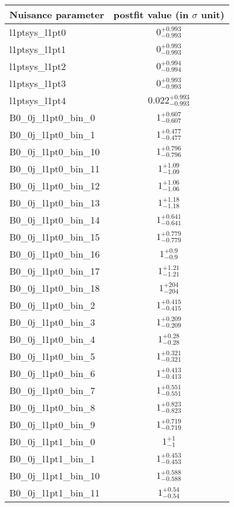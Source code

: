 
\begin{tabular}{|l|c|}
\hline
Nuisance parameter & postfit value (in $\sigma$ unit) \\\hline
l1ptsys\_l1pt0 & $0^{+0.993}_{-0.993}$ \\
l1ptsys\_l1pt1 & $0^{+0.993}_{-0.993}$ \\
l1ptsys\_l1pt2 & $0^{+0.994}_{-0.994}$ \\
l1ptsys\_l1pt3 & $0^{+0.993}_{-0.993}$ \\
l1ptsys\_l1pt4 & $0.022^{+0.993}_{-0.993}$ \\
B0\_0j\_l1pt0\_bin\_0 & $1^{+0.607}_{-0.607}$ \\
B0\_0j\_l1pt0\_bin\_1 & $1^{+0.477}_{-0.477}$ \\
B0\_0j\_l1pt0\_bin\_10 & $1^{+0.796}_{-0.796}$ \\
B0\_0j\_l1pt0\_bin\_11 & $1^{+1.09}_{-1.09}$ \\
B0\_0j\_l1pt0\_bin\_12 & $1^{+1.06}_{-1.06}$ \\
B0\_0j\_l1pt0\_bin\_13 & $1^{+1.18}_{-1.18}$ \\
B0\_0j\_l1pt0\_bin\_14 & $1^{+0.641}_{-0.641}$ \\
B0\_0j\_l1pt0\_bin\_15 & $1^{+0.779}_{-0.779}$ \\
B0\_0j\_l1pt0\_bin\_16 & $1^{+0.9}_{-0.9}$ \\
B0\_0j\_l1pt0\_bin\_17 & $1^{+1.21}_{-1.21}$ \\
B0\_0j\_l1pt0\_bin\_18 & $1^{+204}_{-204}$ \\
B0\_0j\_l1pt0\_bin\_2 & $1^{+0.415}_{-0.415}$ \\
B0\_0j\_l1pt0\_bin\_3 & $1^{+0.209}_{-0.209}$ \\
B0\_0j\_l1pt0\_bin\_4 & $1^{+0.28}_{-0.28}$ \\
B0\_0j\_l1pt0\_bin\_5 & $1^{+0.321}_{-0.321}$ \\
B0\_0j\_l1pt0\_bin\_6 & $1^{+0.413}_{-0.413}$ \\
B0\_0j\_l1pt0\_bin\_7 & $1^{+0.551}_{-0.551}$ \\
B0\_0j\_l1pt0\_bin\_8 & $1^{+0.823}_{-0.823}$ \\
B0\_0j\_l1pt0\_bin\_9 & $1^{+0.719}_{-0.719}$ \\
B0\_0j\_l1pt1\_bin\_0 & $1^{+1}_{-1}$ \\
B0\_0j\_l1pt1\_bin\_1 & $1^{+0.453}_{-0.453}$ \\
B0\_0j\_l1pt1\_bin\_10 & $1^{+0.588}_{-0.588}$ \\
B0\_0j\_l1pt1\_bin\_11 & $1^{+0.54}_{-0.54}$ \\

\end{tabular}
